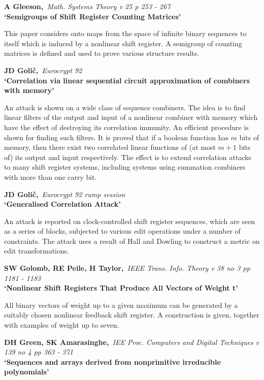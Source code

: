{\bf \noindent A Gleeson,}{\em ~Math. Systems Theory v 25 p 253 - 267\\}
{\bf `Semigroups of Shift Register Counting Matrices'}

This paper considers onto maps from the space of infinite binary sequences to 
itself which is induced by a nonlinear shift register. A semigroup of counting 
matrices is defined and used to prove various structure results.

{\bf \noindent JD Goli\v{c},}{\em ~Eurocrypt 92\\}
{\bf `Correlation via linear sequential circuit approximation of combiners 
with memory'}

An attack is shown on a wide class of sequence combiners. The idea is to
find linear filters of the output and input of a nonlinear combiner with
memory which have the effect of destroying its correlation immunity. An 
efficient procedure is shown for finding such filters. It is proved that
if a boolean function has $m$ bits of memory, then there exist two correlated 
linear functions of (at most $m+1$ bits of) its output and input respectively. 
The effect is to extend correlation attacks to many shift register systems, 
including systems using summation combiners with more than one carry bit.

{\bf \noindent JD Goli\v{c},}{\em ~Eurocrypt 92 rump session\\}
{\bf `Generalised Correlation Attack'}

An attack is reported on clock-controlled shift register sequences, which
are seen as a series of blocks, subjected to various edit operations under
a number of constraints. The attack uses a result of Hall and Dowling to 
construct a metric on edit transformations.

\pagebreak

{\bf \noindent SW Golomb, RE Peile, H Taylor,}{\em ~IEEE Trans. Info. Theory
v 38 no 3 pp 1181 - 1183\\}
{\bf `Nonlinear Shift Registers That Produce All Vectors of Weight t'}

All binary vectors of weight up to a given maximum can be generated by a
suitably chosen nonlinear feedback shift register. A construction is given,
together with examples of weight up to seven.

{\bf \noindent DH Green, SK Amarasinghe,}{\em ~IEE Proc. Computers and
Digital Techniques v 139 no 4 pp 363 - 371\\}
{\bf `Sequences and arrays derived from nonprimitive irreducible polynomials'}

